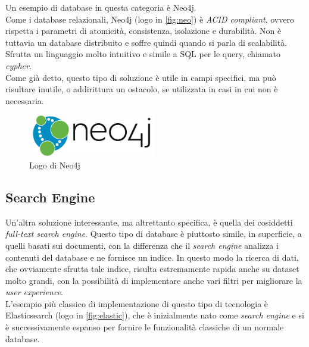 \noindent Un esempio di database in questa categoria è Neo4j\cite{site:udemyneo4j}.\\
Come i database relazionali, Neo4j (logo in \autoref{fig:neo}) è \textit{ACID compliant}, ovvero rispetta i parametri di atomicità, consistenza, isolazione e durabilità. Non è tuttavia un \gls{database distribuito} e soffre quindi quando si parla di scalabilità.\\
Sfrutta un linguaggio molto intuitivo e simile a \gls{SQL} per le query, chiamato \textit{cypher}.\\

\noindent Come già detto, questo tipo di soluzione è utile in campi specifici, ma può risultare inutile, o addirittura un ostacolo, se utilizzata in casi in cui non è necessaria.

\begin{figure}[htbp]
\begin{center}
\includegraphics[height=5em]{immagini/tecnologies-logos/neo4j-logo.png}
\caption{Logo di Neo4j}
\label{fig:neo}
\end{center}
\end{figure}

\subsection{Search Engine}
Un'altra soluzione interessante, ma altrettanto specifica, è quella dei cosiddetti \textit{full-text search engine}. Questo tipo di database è piuttosto simile, in superficie, a quelli basati sui documenti, con la differenza che il \textit{search engine} analizza i contenuti del database e ne fornisce un indice. In questo modo la ricerca di dati, che ovviamente sfrutta tale indice, risulta estremamente rapida anche su dataset molto grandi, con la possibilità di implementare anche vari filtri per migliorare la \textit{user experience}.\\

\noindent L'esempio più classico di implementazione di questo tipo di tecnologia è Elasticsearch (logo in \autoref{fig:elastic}), che è inizialmente nato come \textit{search engine} e si è successivamente espanso per fornire le funzionalità classiche di un normale database\cite{site:udemyelasticsearch}.

